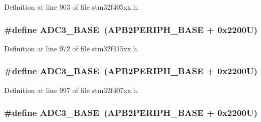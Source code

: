 Definition at line 903 of file stm32f405xx.\+h.

\subsubsection[{\texorpdfstring{A\+D\+C3\+\_\+\+B\+A\+SE}{ADC3_BASE}}]{\setlength{\rightskip}{0pt plus 5cm}\#define A\+D\+C3\+\_\+\+B\+A\+SE~({\bf A\+P\+B2\+P\+E\+R\+I\+P\+H\+\_\+\+B\+A\+SE} + 0x2200\+U)}\hypertarget{group___peripheral__registers__structures_gaca766f86c8e0b00a8e2b0224dcbb4c82}{}\label{group___peripheral__registers__structures_gaca766f86c8e0b00a8e2b0224dcbb4c82}


Definition at line 972 of file stm32f415xx.\+h.

\subsubsection[{\texorpdfstring{A\+D\+C3\+\_\+\+B\+A\+SE}{ADC3_BASE}}]{\setlength{\rightskip}{0pt plus 5cm}\#define A\+D\+C3\+\_\+\+B\+A\+SE~({\bf A\+P\+B2\+P\+E\+R\+I\+P\+H\+\_\+\+B\+A\+SE} + 0x2200\+U)}\hypertarget{group___peripheral__registers__structures_gaca766f86c8e0b00a8e2b0224dcbb4c82}{}\label{group___peripheral__registers__structures_gaca766f86c8e0b00a8e2b0224dcbb4c82}


Definition at line 997 of file stm32f407xx.\+h.

\subsubsection[{\texorpdfstring{A\+D\+C3\+\_\+\+B\+A\+SE}{ADC3_BASE}}]{\setlength{\rightskip}{0pt plus 5cm}\#define A\+D\+C3\+\_\+\+B\+A\+SE~({\bf A\+P\+B2\+P\+E\+R\+I\+P\+H\+\_\+\+B\+A\+SE} + 0x2200\+U)}\hypertarget{group___peripheral__registers__structures_gaca766f86c8e0b00a8e2b0224dcbb4c82}{}\label{group___peripheral__registers__structures_gaca766f86c8e0b00a8e2b0224dcbb4c82}


